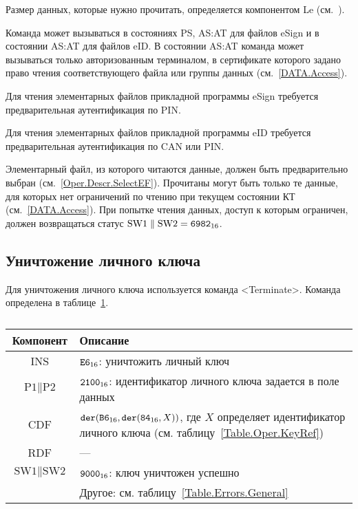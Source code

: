 Размер данных, которые нужно прочитать, определяется компонентом 
Le (см.~\cite{APDU}).

Команда может вызываться в состояниях PS, AS:AT 
для файлов eSign и в состоянии AS:AT для файлов eID.
В состоянии AS:AT команда может вызываться только 
авторизованным терминалом, в сертификате которого
задано право чтения соответствующего файла или группы данных
(см.~\ref{DATA.Access}).

Для чтения элементарных файлов прикладной программы eSign 
требуется предварительная аутентификация по PIN.

Для чтения элементарных файлов прикладной программы eID 
требуется предварительная аутентификация по CAN или PIN.

Элементарный файл, из которого читаются данные, должен быть предварительно 
выбран (см.~\ref{Oper.Descr.SelectEF}). Прочитаны могут быть только те данные, 
для которых нет ограничений по чтению при текущем состоянии КТ 
(см.~\ref{DATA.Access}). При попытке чтения данных, доступ к которым ограничен, 
должен возвращаться статус $\text{SW1} \parallel \text{SW2} = \texttt{6982}_{16}$.

\subsection{Уничтожение личного ключа}
\label{Oper.Descr.Terminate}

Для уничтожения личного ключа используется команда <Terminate>.
Команда определена в таблице~\ref{Table.Oper.TerminateCmd}.

\begin{table}[ht]
\caption{}\label{Table.Oper.TerminateCmd}
\begin{tabular}{|c|p{14cm}|}
\hline
Компонент & Описание\\
\hline
\hline
INS & $\texttt{E6}_{16}$: уничтожить личный ключ \\
\hline
$\text{P1} \parallel\text{P2}$ & $\texttt{2100}_{16}$:
идентификатор личного ключа задается в поле данных\\
\hline
CDF &  $\texttt{der}(\texttt{B6}_{16},\texttt{der}(\texttt{84}_{16}, X))$,
где $X$ определяет идентификатор личного ключа
(см. таблицу~\ref{Table.Oper.KeyRef})\\ 
\hline 
RDF & ---  \\
\hline
$\text{SW1} \parallel \text{SW2}$ & 
$\texttt{9000}_{16}$: ключ уничтожен успешно\\
\cline{2-2}
 & Другое: см. таблицу~\ref{Table.Errors.General} \\
\hline
\end{tabular}
\end{table}

